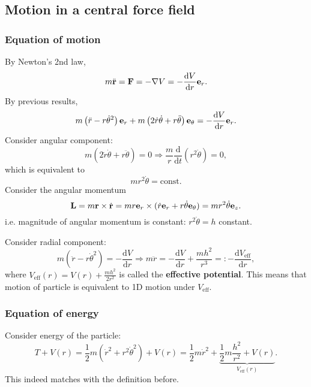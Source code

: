 \subsection{Motion in a central force field}
\subsubsection*{Equation of motion}
By Newton's 2nd law,
\[
    m \ddot{{\bf r}} = {\bf F} = - \nabla V = -\frac{\mathrm{d}V}{\mathrm{d}r}{\bf e}_r. 
\]
By previous results,
\[
    m\left( \ddot{r}-r\dot{\theta}^2 \right){\bf e}_r+m\left( 2 \dot{r}\dot{\theta}+r \ddot{\theta} \right){\bf e}_\theta=-\frac{\mathrm{d}V}{\mathrm{d}r}{\bf e}_r. 
\]
Consider angular component: 
\[
    m\left( 2 \dot{r}\dot{\theta}+r \ddot{\theta} \right) =0
    \Longrightarrow\frac{m}{r}\frac{\mathrm{d}}{\mathrm{d}t}\left( r^2\dot{\theta} \right)=0,
\]
which is equivalent to 
\[
    m r^2 \dot{\theta} = \text{const}.
\]
Consider the angular momentum 
\[
    {\bf L} = m{\bf r} \times \dot{{\bf r}} = mr{\bf e}_r \times (\dot{r}{\bf e}_r+r \dot{\theta}{\bf e}_\theta) =mr^2 \dot{\theta}{\bf e}_z.
\]
i.e. magnitude of angular momentum is constant: $ r^2 \dot{\theta}=h $ constant.

Consider radial component: 
\begin{equation}\label{eq:radial component}\tag{$*$}
    m\left( \ddot{r}-r\dot{\theta}^2 \right) = -\frac{\mathrm{d}V}{\mathrm{d}r} \Longrightarrow m \ddot{r}=-\frac{\mathrm{d}V}{\mathrm{d}r}+\frac{mh^2}{r^3}=: -\frac{\mathrm{d}V_{\text{eff}}}{\mathrm{d}r},  
\end{equation}
where $ V_{\text{eff}}(r)=V(r)+\frac{mh^2}{2r^2} $ is called the \textbf{effective potential}. This means that motion of particle is equivalent to 1D motion under $ V_{\text{eff}} $.
\subsubsection*{Equation of energy}
Consider energy of the particle:
\[
    T+V(r) = \frac{1}{2}m \left( \dot{r}^2+r^2 \dot{\theta}^2 \right) +V(r) = \frac{1}{2}m \dot{r}^2+\underbrace{\frac{1}{2}m\frac{h^2}{r^2}+V(r)}_{V_{\text{eff}}(r)}.
\]
This indeed matches with the definition before.

